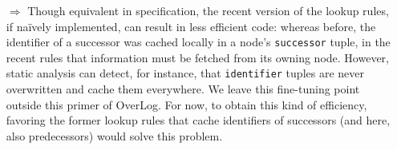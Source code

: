 \documentclass{article}
\begin{document}
\begin{itemize}
\item[$\Longrightarrow$] Though equivalent in specification, the recent
  version of the lookup rules, if na\"{i}vely implemented, can result in
  less efficient code: whereas before, the identifier of a successor was
  cached locally in a node's \lstinline$successor$ tuple, in the recent
  rules that information must be fetched from its owning node.  However,
  static analysis can detect, for instance, that \lstinline$identifier$
  tuples are never overwritten and cache them everywhere. We leave this
  fine-tuning point outside this primer of OverLog. For now, to obtain
  this kind of efficiency, favoring the former lookup rules that cache
  identifiers of successors (and here, also predecessors) would solve
  this problem.
\end{itemize}
\end{document}

